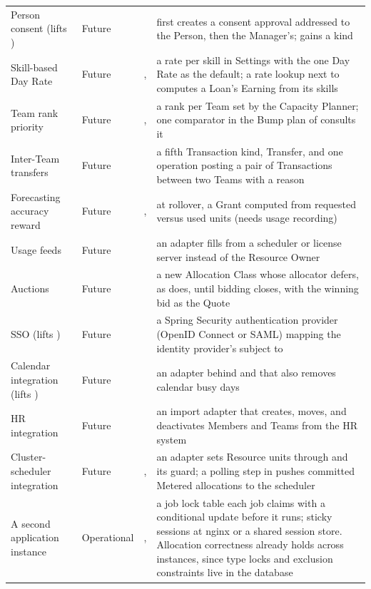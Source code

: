 {\begin{longtable}{@{}L{0.27\textwidth}L{0.08\textwidth}L{0.17\textwidth}L{\tabcolsep\relax}@{}}
Person consent (lifts ) & Future &  &  first creates a consent approval addressed to the Person, then the Manager's;  gains a kind \\
Skill-based Day Rate & Future & ,  & a rate per skill in Settings with the one Day Rate as the default; a rate lookup next to  computes a Loan's Earning from its skills \\
Team rank priority & Future & ,  & a rank per Team set by the Capacity Planner; one comparator in the Bump plan of  consults it \\
Inter-Team transfers & Future &  & a fifth Transaction kind, Transfer, and one operation posting a pair of Transactions between two Teams with a reason \\
Forecasting accuracy reward & Future & ,  & at rollover, a Grant computed from requested versus used units (needs usage recording) \\
Usage feeds & Future &  & an adapter fills  from a scheduler or license server instead of the Resource Owner \\
Auctions & Future &  & a new Allocation Class whose allocator defers, as  does, until bidding closes, with the winning bid as the Quote \\
SSO (lifts ) & Future &  & a Spring Security authentication provider (OpenID Connect or SAML) mapping the identity provider's subject to  \\
Calendar integration (lifts ) & Future &  & an adapter behind  and  that also removes calendar busy days \\
HR integration & Future &  & an import adapter that creates, moves, and deactivates Members and Teams from the HR system \\
Cluster-scheduler integration & Future & ,  & an adapter sets Resource units through  and its guard; a polling step in  pushes committed Metered allocations to the scheduler \\
A second application instance & Oper\-ational & ,  & a job lock table each job claims with a conditional update before it runs; sticky sessions at nginx or a shared session store. Allocation correctness already holds across instances, since type locks and exclusion constraints live in the database \\

\end{longtable}}
